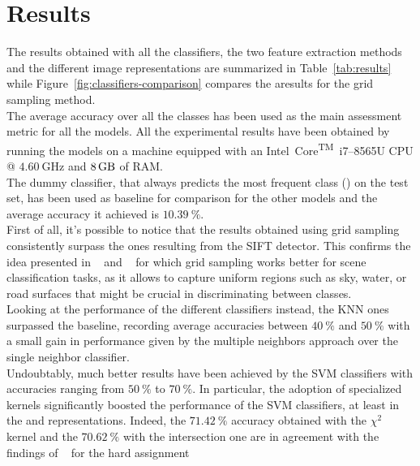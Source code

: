 \documentclass[../main.tex]{subfiles}
\begin{document}
\section{Results}\label{sec:results}

The results obtained with all the classifiers, the two feature extraction
methods and the different image representations are summarized in
Table~\ref{tab:results} while Figure~\ref{fig:classifiers-comparison} compares
the aresults for the grid sampling method.\\
The average accuracy over all the classes has been used as the main assessment
metric for all the models. 
All the experimental results have been obtained by running the models on a machine equipped with an Intel\textsuperscript{\textregistered}~Core\textsuperscript{TM}~i7--8565U CPU @ $\SI{4.60}{\giga\hertz}$ and $\SI{8}{\giga\byte}$ of RAM.\\
The dummy classifier, that always predicts the most frequent class  () on the test set, has been used as baseline for comparison
for the other models and the average accuracy it achieved is $\SI{10.39}{\percent}$.\\
First of all, it's possible to notice that the results obtained using grid sampling consistently surpass the ones resulting from the SIFT detector. This confirms the idea presented in ~\cite{feifei} and ~\cite{lazebnik} for which grid sampling works better for scene classification tasks, as it allows to capture uniform regions such as sky, water, or road surfaces that might be crucial in discriminating between classes.\\
Looking at the performance of the different classifiers instead, the KNN ones
surpassed the baseline, recording average accuracies
between $\SI{40}{\percent}$ and $\SI{50}{\percent}$ with a small gain in
performance given by the multiple neighbors approach over the single
neighbor classifier.\\
Undoubtably, much better results have been achieved by the SVM
classifiers with accuracies ranging from $\SI{50}{\percent}$ to
$\SI{70}{\percent}$.
In particular, the adoption of specialized kernels significantly boosted the
performance of the SVM classifiers, at least in the  and 
representations.
Indeed, the $\SI{71.42}{\percent}$ accuracy obtained with the $\chi^2$ kernel
and the $\SI{70.62}{\percent}$ with the intersection one are in agreement with
the findings of ~\cite{gemert} for the hard assignment
\end{document}
